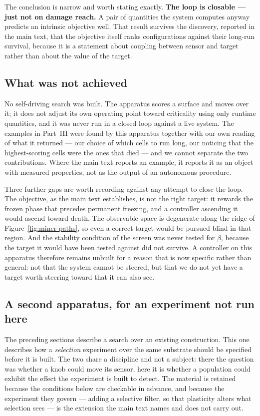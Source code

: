 \documentclass[man,12pt,floatsintext,donotrepeattitle]{apa7}
\begin{document}
The conclusion is narrow and worth stating exactly. \textbf{The loop is closable
--- just not on damage reach.} A pair of quantities the system computes anyway
predicts an intrinsic objective well. That result survives the discovery,
reported in the main text, that the objective itself ranks configurations
against their long-run survival, because it is a statement about coupling
between sensor and target rather than about the value of the target.

\subsection*{What was not achieved}
\label{supp:miner-negative}

No self-driving search was built. The apparatus scores a surface and moves over
it; it does not adjust its own operating point toward criticality using only
runtime quantities, and it was never run in a closed loop against a live system.
The examples in Part~III were found by this apparatus together with our own
reading of what it returned --- our choice of which cells to run long, our
noticing that the highest-scoring cells were the ones that died --- and we cannot
separate the two contributions. Where the main text reports an example, it
reports it as an object with measured properties, not as the output of an
autonomous procedure.

Three further gaps are worth recording against any attempt to close the loop.
The objective, as the main text establishes, is not the right target: it rewards
the frozen phase that precedes permanent freezing, and a controller ascending it
would ascend toward death. The observable space is degenerate along the ridge of
Figure~\ref{fig:miner-paths}, so even a correct target would be pursued blind in
that region. And the stability condition of the screen was never tested for
$\beta$, because the target it would have been tested against did not survive.
A controller on this apparatus therefore remains unbuilt for a reason that is
now specific rather than general: not that the system cannot be steered, but
that we do not yet have a target worth steering toward that it can also see.


\subsection*{A second apparatus, for an experiment not run here}

The preceding sections describe a search over an existing construction. This one
describes how a \emph{selection} experiment over the same substrate should be
specified before it is built. The two share a discipline and not a subject: there
the question was whether a knob could move its sensor, here it is whether a
population could exhibit the effect the experiment is built to detect. The
material is retained because the conditions below are checkable in advance, and
because the experiment they govern --- adding a selective filter, so that
plasticity alters what selection sees --- is the extension the main text names and
does not carry out.
\end{document}
